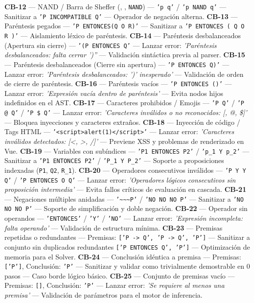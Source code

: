 \documentclass[11pt,a4paper,openany]{book}
\begin{document}
\textbf{CB-12} --- NAND / Barra de Sheffer (\texttt{}, \texttt{}, \texttt{NAND}) --- \texttt{'p  q'} / \texttt{'p NAND q'} --- Sanitizar a \texttt{'P INCOMPATIBLE Q'} --- Operador de negación alterna.
\textbf{CB-13} --- Paréntesis pegados --- \texttt{'P ENTONCES(Q O R)'} --- Sanitizar a \texttt{'P ENTONCES ( Q O R )'} --- Aislamiento léxico de paréntesis.
\textbf{CB-14} --- Paréntesis desbalanceados (Apertura sin cierre) --- \texttt{'(P ENTONCES Q'} --- Lanzar error: \textit{'Paréntesis desbalanceados: falta cerrar ')''} --- Validación sintáctica previa al parser.
\textbf{CB-15} --- Paréntesis desbalanceados (Cierre sin apertura) --- \texttt{'P ENTONCES Q)'} --- Lanzar error: \textit{'Paréntesis desbalanceados: ')' inesperado'} --- Validación de orden de cierre de paréntesis.
\textbf{CB-16} --- Paréntesis vacíos --- \texttt{'P ENTONCES ()'} --- Lanzar error: \textit{'Expresión vacía dentro de paréntesis'} --- Evita nodos hijos indefinidos en el AST.
\textbf{CB-17} --- Caracteres prohibidos / Emojis --- \texttt{'P  Q'} / \texttt{'P @ Q'} / \texttt{'P \$ Q'} --- Lanzar error: \textit{'Caracteres inválidos o no reconocidos: [, @, \$]'} --- Bloquea inyecciones y caracteres extraños.
\textbf{CB-18} --- Inyección de código / Tags HTML --- \texttt{'<script>alert(1)</script>'} --- Lanzar error: \textit{'Caracteres inválidos detectados: [<, >, /]'} --- Previene XSS y problemas de renderizado en Vue.
\textbf{CB-19} --- Variables con subíndices --- \texttt{'P1 ENTONCES P2'} / \texttt{'p\_1 Y p\_2'} --- Sanitizar a \texttt{'P1 ENTONCES P2'} / \texttt{'P\_1 Y P\_2'} --- Soporte a proposiciones indexadas (\texttt{P1}, \texttt{Q2}, \texttt{R\_1}).
\textbf{CB-20} --- Operadores consecutivos inválidos --- \texttt{'P Y Y Q'} / \texttt{'P ENTONCES O Q'} --- Lanzar error: \textit{'Operadores lógicos consecutivos sin proposición intermedia'} --- Evita fallos críticos de evaluación en cascada.
\textbf{CB-21} --- Negaciones múltiples anidadas --- \texttt{'\textasciitilde{}\textasciitilde{}\textasciitilde{}P'} / \texttt{'NO NO NO P'} --- Sanitizar a \texttt{'NO NO NO P'} --- Soporte de simplificación y doble negación.
\textbf{CB-22} --- Operador sin operandos --- \texttt{'ENTONCES'} / \texttt{'Y'} / \texttt{'NO'} --- Lanzar error: \textit{'Expresión incompleta: falta operando'} --- Validación de estructura mínima.
\textbf{CB-23} --- Premisas repetidas o redundantes --- Premisas: \texttt{['P -> Q', 'P -> Q', 'P']} --- Sanitizar a conjunto sin duplicados redundantes \texttt{['P ENTONCES Q', 'P']} --- Optimización de memoria para el Solver.
\textbf{CB-24} --- Conclusión idéntica a premisa --- Premisas: \texttt{['P']}, Conclusión: \texttt{'P'} --- Sanitizar y validar como trivialmente demostrable en 0 pasos --- Caso borde lógico básico.
\textbf{CB-25} --- Conjunto de premisas vacío --- Premisas: \texttt{[]}, Conclusión: \texttt{'P'} --- Lanzar error: \textit{'Se requiere al menos una premisa'} --- Validación de parámetros para el motor de inferencia.
\end{document}
